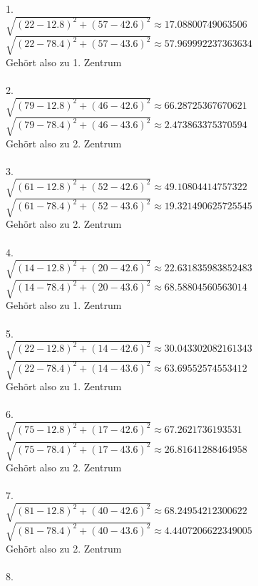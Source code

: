 \begin{enumerate}
1. \\ 
$\sqrt{(22-12.8)^2 + (57-42.6)^2} \approx 17.08800749063506$ \\ 
$\sqrt{(22-78.4)^2 + (57-43.6)^2} \approx 57.969992237363634$ \\ 
Gehört also zu 1. Zentrum \\ \\
2. \\ 
$\sqrt{(79-12.8)^2 + (46-42.6)^2} \approx 66.28725367670621$ \\ 
$\sqrt{(79-78.4)^2 + (46-43.6)^2} \approx 2.473863375370594$ \\ 
Gehört also zu 2. Zentrum \\ \\
3. \\ 
$\sqrt{(61-12.8)^2 + (52-42.6)^2} \approx 49.10804414757322$ \\ 
$\sqrt{(61-78.4)^2 + (52-43.6)^2} \approx 19.321490625725545$ \\ 
Gehört also zu 2. Zentrum \\ \\
4. \\ 
$\sqrt{(14-12.8)^2 + (20-42.6)^2} \approx 22.631835983852483$ \\ 
$\sqrt{(14-78.4)^2 + (20-43.6)^2} \approx 68.58804560563014$ \\ 
Gehört also zu 1. Zentrum \\ \\
5. \\ 
$\sqrt{(22-12.8)^2 + (14-42.6)^2} \approx 30.043302082161343$ \\ 
$\sqrt{(22-78.4)^2 + (14-43.6)^2} \approx 63.69552574553412$ \\ 
Gehört also zu 1. Zentrum \\ \\
6. \\ 
$\sqrt{(75-12.8)^2 + (17-42.6)^2} \approx 67.2621736193531$ \\ 
$\sqrt{(75-78.4)^2 + (17-43.6)^2} \approx 26.81641288464958$ \\ 
Gehört also zu 2. Zentrum \\ \\
7. \\ 
$\sqrt{(81-12.8)^2 + (40-42.6)^2} \approx 68.24954212300622$ \\ 
$\sqrt{(81-78.4)^2 + (40-43.6)^2} \approx 4.4407206622349005$ \\ 
Gehört also zu 2. Zentrum \\ \\
8. \\ 

\end{enumerate}
